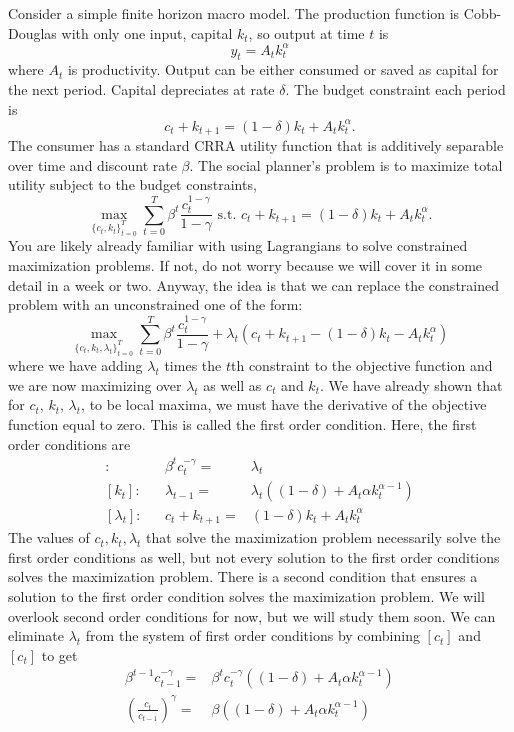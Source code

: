 \documentclass[12pt,reqno]{amsart}
\theoremstyle{definition}
\begin{document}
Consider a simple finite horizon macro model. The production
function is Cobb-Douglas with only one input, capital $k_t$, so output
at time $t$ is
\[ y_t = A_t k_t^\alpha \]
where $A_t$ is productivity. Output can be either consumed or saved as
capital for the next period. Capital depreciates at rate $\delta$. The
budget constraint each period is
\[ c_t + k_{t+1} = (1-\delta) k_t + A_t k_t^\alpha. \]
The consumer has a standard CRRA utility function that is additively
separable over time and discount rate $\beta$. The social planner's
problem is to maximize total utility subject to the budget constraints,
\[ \max_{\{c_t,k_t\}_{t=0}^T} \sum_{t=0}^T \beta^t
\frac{c_t^{1-\gamma}} {1-\gamma}  \text{ s.t. } c_t + k_{t+1} =
(1-\delta) k_t + A_t k_t^\alpha. \]
You are likely already familiar with using Lagrangians to solve
constrained maximization problems. If not, do not worry because we
will cover it in some detail in a week or two. Anyway, the idea is
that we can replace the constrained problem with an unconstrained one
of the form:
\[ \max_{\{c_t,k_t,\lambda_t\}_{t=0}^T} \sum_{t=0}^T \beta^t
\frac{c_t^{1-\gamma}} {1-\gamma}  + \lambda_t(c_t + k_{t+1} - 
(1-\delta) k_t - A_t k_t^\alpha) \]
where we have adding $\lambda_t$ times the $t$th constraint to the
objective function and we are now maximizing over $\lambda_t$ as well
as $c_t$ and $k_t$. We have already shown that for $c_t$, $k_t$,
$\lambda_t$, to be local maxima, we must have the derivative of the
objective function equal to zero. This is called the first order
condition. Here, the first order conditions are
\begin{align*}
  [c_t]: & & \beta^t c_t^{-\gamma} = & \lambda_t \\
  [k_t]: & & \lambda_{t-1} = & \lambda_t\left((1-\delta) + A_t \alpha
    k_t^{\alpha-1}\right) \\
  [\lambda_t]: & & c_t + k_{t+1} = & (1-\delta) k_t + A_t k_t^\alpha
\end{align*}
The values of $c_t,k_t,\lambda_t$ that solve the maximization problem
necessarily solve the first order conditions as well, but not every
solution to the first order conditions solves the maximization
problem. There is a second condition that ensures a solution to the
first order condition solves the maximization problem. We will
overlook second order conditions for now, but we will study them
soon. We can eliminate $\lambda_t$ from the system of first order
conditions by combining $[c_t]$ and $[c_t]$ to get
\begin{align*}
  \beta^{t-1} c_{t-1}^{-\gamma} = & \beta^t
  c_t^{-\gamma}\left((1-\delta) +  A_t \alpha
    k_t^{\alpha-1} \right) \\
  \left(\frac{c_t}{c_{t-1}}\right)^{\gamma} = & \beta\left((1-\delta)
    +  A_t \alpha k_t^{\alpha-1} \right)
\end{align*}
\end{document}
